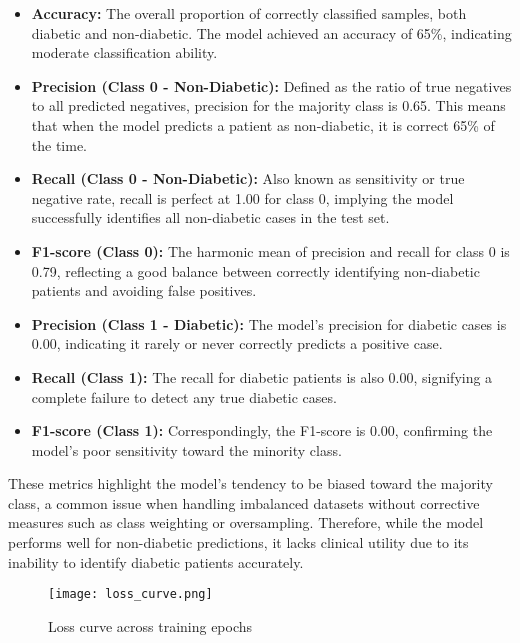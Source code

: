 \documentclass[12pt]{article}
\begin{document}
\begin{itemize}
    \item \textbf{Accuracy:} The overall proportion of correctly classified samples, both diabetic and non-diabetic. The model achieved an accuracy of 65\%, indicating moderate classification ability.
    
    \item \textbf{Precision (Class 0 - Non-Diabetic):} Defined as the ratio of true negatives to all predicted negatives, precision for the majority class is 0.65. This means that when the model predicts a patient as non-diabetic, it is correct 65\% of the time.
    
    \item \textbf{Recall (Class 0 - Non-Diabetic):} Also known as sensitivity or true negative rate, recall is perfect at 1.00 for class 0, implying the model successfully identifies all non-diabetic cases in the test set.
    
    \item \textbf{F1-score (Class 0):} The harmonic mean of precision and recall for class 0 is 0.79, reflecting a good balance between correctly identifying non-diabetic patients and avoiding false positives.
    
    \item \textbf{Precision (Class 1 - Diabetic):} The model's precision for diabetic cases is 0.00, indicating it rarely or never correctly predicts a positive case.
    
    \item \textbf{Recall (Class 1):} The recall for diabetic patients is also 0.00, signifying a complete failure to detect any true diabetic cases.
    
    \item \textbf{F1-score (Class 1):} Correspondingly, the F1-score is 0.00, confirming the model's poor sensitivity toward the minority class.
\end{itemize}

These metrics highlight the model’s tendency to be biased toward the majority class, a common issue when handling imbalanced datasets without corrective measures such as class weighting or oversampling. Therefore, while the model performs well for non-diabetic predictions, it lacks clinical utility due to its inability to identify diabetic patients accurately.


\begin{figure}[H]
\centering
\texttt{[image: loss\_curve.png]}
\caption{Loss curve across training epochs}
\end{figure}
\end{document}
